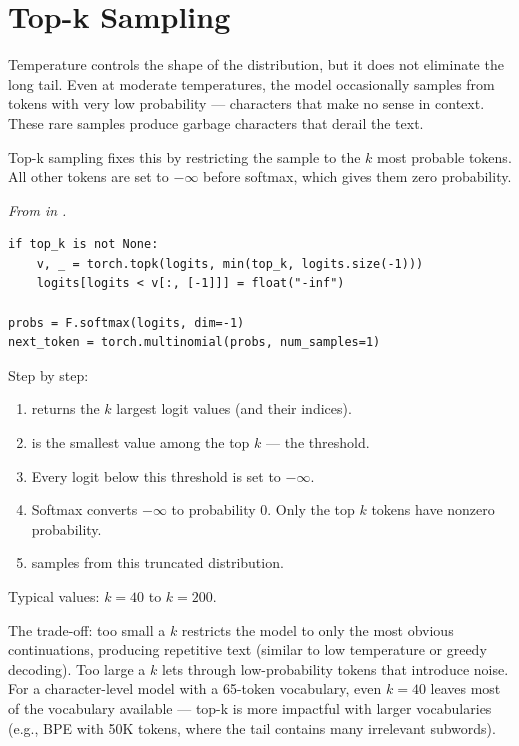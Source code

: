 \section{Top-k Sampling}

Temperature controls the shape of the distribution, but it does not eliminate the long tail. Even at moderate temperatures, the model occasionally samples from tokens with very low probability --- characters that make no sense in context. These rare samples produce garbage characters that derail the text.

Top-k sampling fixes this by restricting the sample to the $k$ most probable tokens. All other tokens are set to $-\infty$ before softmax, which gives them zero probability.

\concepttag
{\small\itshape From  in .}
\begin{lstlisting}
if top_k is not None:
    v, _ = torch.topk(logits, min(top_k, logits.size(-1)))
    logits[logits < v[:, [-1]]] = float("-inf")

probs = F.softmax(logits, dim=-1)
next_token = torch.multinomial(probs, num_samples=1)
\end{lstlisting}

Step by step:

\begin{enumerate}
  \item {} returns the $k$ largest logit values (and their indices).
  \item {} is the smallest value among the top $k$ --- the threshold.
  \item Every logit below this threshold is set to $-\infty$.
  \item Softmax converts $-\infty$ to probability 0. Only the top $k$ tokens have nonzero probability.
  \item {} samples from this truncated distribution.
\end{enumerate}

Typical values: $k = 40$ to $k = 200$.

The trade-off: too small a $k$ restricts the model to only the most obvious continuations, producing repetitive text (similar to low temperature or greedy decoding). Too large a $k$ lets through low-probability tokens that introduce noise. For a character-level model with a 65-token vocabulary, even $k = 40$ leaves most of the vocabulary available --- top-k is more impactful with larger vocabularies (e.g., BPE with 50K tokens, where the tail contains many irrelevant subwords).

